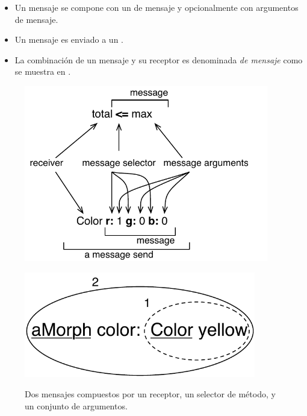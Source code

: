 \documentclass[a4paper,10pt,twoside]{book}
\begin{document}
\begin{itemize}
  \item Un mensaje se compone  con un  de mensaje y opcionalmente con argumentos de mensaje.
  \item Un mensaje es enviado a un .
  \item La combinaci\'on de un mensaje y su receptor es denominada  \emph{de mensaje} como se muestra en .
\end{itemize}

\begin{figure}[htb]
\begin{minipage}{0.53\textwidth}
	\begin{center}
	\includegraphics[width=0.95\textwidth]{message}
	\caption{Dos mensajes compuestos por un receptor, un selector de m\'etodo, y un conjunto de argumentos.}\end{center}
\end{minipage}
\hfill
\begin{minipage}{0.43\textwidth}
	\begin{center}
	\ifluluelse
		{\includegraphics[width=0.9\textwidth]{uKeyUnOne}}

\end{center}
\end{minipage}
\end{figure}
\end{document}
